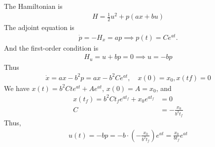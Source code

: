 \documentclass[12pt]{article}
\begin{document}
\begin{problem}[2]
The Hamiltonian is
\begin{align*}
	H = \frac{1}{2} u^2 + p(ax+bu)
\end{align*}
The adjoint equation is
\begin{align*}
	\dot{p} = -H_x = ap \implies p(t) = C e^{at}.
\end{align*}
And the first-order condition is
\begin{align*}
	H_u = u+bp = 0 \implies u=-bp
\end{align*}
Thus
\begin{align*}
	\dot{x} = ax-b^2p = ax - b^2 C e^{at}, \quad x(0)=x_0,x(tf) = 0
\end{align*}
We have $ x(t) = b^2 C t e^{at} + A e^{at}$, $ x(0) = A = x_0$, and
\begin{align*}
	x(t_f) = b^2 C t_f e^{at_f} + x_0 e^{at_f} &= 0 \\
	C &= - \frac{x_0}{ b^2 t_f}
\end{align*}
Thus,
\begin{align*}
	u(t) = -bp = -b \cdot \left( - \frac{x_0}{b^2 t_f} \right) e^{at}  = \frac{x_0}{ b t_f} e^{at}
\end{align*}
\end{problem}
\end{document}
